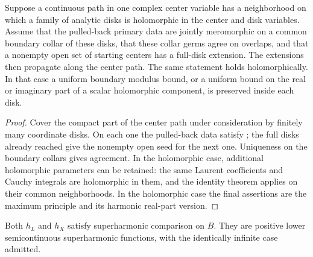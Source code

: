 \begin{corollary}
\label{cont:disc-sweep}
Suppose a continuous path in one complex center variable has a neighborhood
on which a family of analytic disks is holomorphic in the center
and disk variables.  Assume that the pulled-back primary data are
jointly meromorphic on a common boundary collar of these disks,
that these collar germs agree on overlaps, and that a nonempty
open set of starting centers has a full-disk extension.  The
extensions then propagate along the center path.  The same
statement holds holomorphically.  In that case a uniform
boundary modulus bound, or a uniform bound on the real or
imaginary part of a scalar holomorphic component, is preserved
inside each disk.
\end{corollary}

\begin{proof}
Cover the compact part of the center path under consideration by
finitely many coordinate disks.  On each one the pulled-back
data satisfy ; the full disks
already reached give the nonempty open seed for the next one.
Uniqueness on the boundary collars gives agreement.  In the
holomorphic case, additional holomorphic parameters can be retained:
the same
Laurent coefficients and Cauchy integrals are holomorphic in
them, and the identity theorem applies on their common
neighborhoods.  In the holomorphic case the final assertions are
the maximum principle and its harmonic real-part version.
\end{proof}

\begin{proposition}
\label{prop:width-superharmonic}
Both \(h_L\) and \(h_X\) satisfy superharmonic comparison on \(B\).
They are positive lower semicontinuous superharmonic functions,
with the identically infinite case admitted.
\end{proposition}

